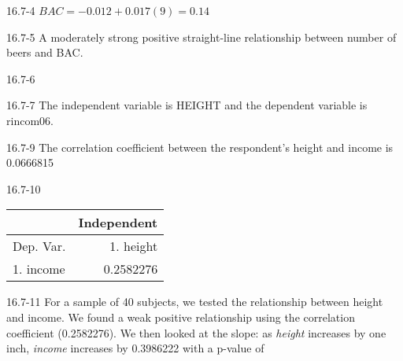 \begin{exsol@solution}{16.7-4}
     $ BAC = -0.012 + 0.017 (9) = 0.14 $

\end{exsol@solution}
\begin{exsol@solution}{16.7-5}
    A moderately strong positive straight-line relationship between number of beers and BAC.

\end{exsol@solution}
\begin{exsol@solution}{16.7-6}

\end{exsol@solution}
\begin{exsol@solution}{16.7-7}
       The independent variable is HEIGHT and the dependent variable is rincom06.

\end{exsol@solution}
\begin{exsol@solution}{16.7-9}
       The correlation coefficient between the respondent's height and income is 0.0666815

\end{exsol@solution}
\begin{exsol@solution}{16.7-10}
       \begin{table}[ht]
    \centering
    \begin{tabular}{lr} \hline
        &  \multicolumn{1}{c}{Independent} \\ \hline

    Dep. Var. & 1. height      \\ \hline
    1. income  &   0.2582276      \\ \hline

    \end{tabular}
    \end{table}

\end{exsol@solution}
\begin{exsol@solution}{16.7-11}
    For a sample of 40 subjects, we tested the relationship between height and income.  We found a weak positive relationship using the correlation coefficient (0.2582276).  We then looked at the slope:  as {\textit{height}} increases by one inch, {\textit{income}} increases by 0.3986222 with a p-value of

\end{exsol@solution}
